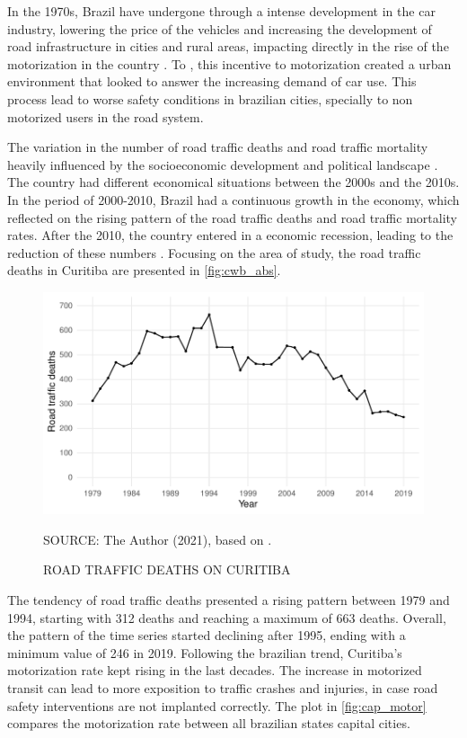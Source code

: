 In the 1970s, Brazil have undergone through a intense development in the car industry, lowering the price of the vehicles and increasing the development of road infrastructure in cities and rural areas, impacting directly in the rise of the motorization in the country \cite{Vasconcellos2013}. To \textcite{Harvey1982}, this incentive to motorization created a urban environment that looked to answer the increasing demand of car use. This process lead to worse safety conditions in brazilian cities, specially to non motorized users in the road system.   

The variation in the number of road traffic deaths and road traffic mortality heavily influenced by the socioeconomic development and political landscape \cite{Ferraz2012}. The country had different economical situations between the 2000s and the 2010s. In the period of 2000-2010, Brazil had a continuous growth in the economy, which reflected on the rising pattern of the road traffic deaths and road traffic mortality rates. After the 2010, the country entered in a economic recession, leading to the reduction of these numbers \cite{Bastos2020}. Focusing on the area of study, the road traffic deaths in Curitiba are presented in \autoref{fig:cwb_abs}.   

\begin{figure}[!htbp]
    \centering\footnotesize
    \captionsetup{font=footnotesize}
    \caption{ROAD TRAFFIC DEATHS ON CURITIBA}
    \includegraphics{fig/cwb_abs.pdf}
    \label{fig:cwb_abs}
    \par SOURCE: The Author (2021), based on \textcite{MinistryofHealth2020}.
\end{figure}  

The tendency of road traffic deaths presented a rising pattern between 1979 and 1994, starting with 312 deaths and reaching a maximum of 663 deaths. Overall, the pattern of the time series started declining after 1995, ending with a minimum value of 246 in 2019. Following the brazilian trend, Curitiba's motorization rate kept rising in the last decades. The increase in motorized transit can lead to more exposition to traffic crashes and injuries, in case road safety interventions are not implanted correctly. The plot in \autoref{fig:cap_motor} compares the motorization rate between all brazilian states capital cities.    

